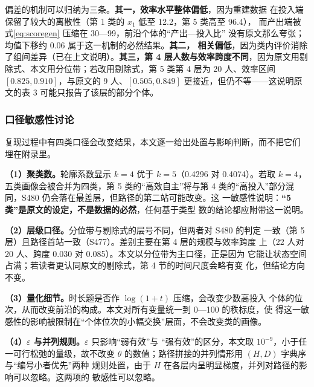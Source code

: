 偏差的机制可以归纳为三条。\textbf{其一，效率水平整体偏低}，因为重建数据
在投入端保留了较大的离散性（第 1 类的 $x_1$ 低至 12.2，第 5 类高至 96.4），
而产出端被式\eqref{eq:scoregen} 压缩在 30—99，前沿个体的“产出—投入比”
没有原文那么夸张；均值下移约 0.06 属于这一机制的必然结果。\textbf{其二，
相关偏低}，因为类内评价消除了组间差异（已在上文说明）。\textbf{其三，第 4
层人数与效率跨度不同}，因为原文用剔除式、本文用分位带；若改用剔除式，第 5
类第 4 层为 20 人、效率区间 $[0.825,0.910]$，与原文的 9 人、$[0.505,
0.849]$ 更接近，但仍不等——这说明原文的表 3 可能只报告了该层的部分个体。

\subsubsection{口径敏感性讨论}
\label{sec:sens}

复现过程中有四类口径会改变结果，本文逐一给出处置与影响判断，而不把它们
埋在附录里。

\textbf{（1）聚类数。}轮廓系数显示 $k=4$ 优于 $k=5$（0.4296 对
0.4074）。若取 $k=4$，五类画像会被合并为四类，第 5 类的“高效自主”将与第
4 类的“高投入”部分混同，S480 仍会落在最差层，但路径的第二站可能改变。这
一敏感性说明：\textbf{“5 类”是原文的设定，不是数据的必然}，任何基于类型
数的结论都应附带这一说明。

\textbf{（2）层级口径。}分位带与剔除式的层号不同，但两者对 S480 的判定
一致（第 5 层）且路径首站一致（S477）。差别主要在第 4 层的规模与效率跨度
上（22 人对 20 人、跨度 0.030 对 0.085）。本文以分位带为主口径，正是因为
它能让状态空间占满；若读者更认同原文的剔除式，第 4 节的时间尺度会略有变
化，但结论方向不变。

\textbf{（3）量化细节。}时长题是否作 $\log(1+t)$ 压缩，会改变少数高投入
个体的位次，从而改变前沿的构成。本文对所有变量统一到 0—100 的秩标度，使
得这一敏感性的影响被限制在“个体位次的小幅交换”层面，不会改变类的画像。

\textbf{（4）$\varepsilon$ 与并列规则。}$\varepsilon$ 只影响“弱有效”与
“强有效”的区分，本文取 $10^{-9}$，小于任一可行松弛的量级，故不改变
$\theta$ 的数值；路径拼接的并列情形用 $(H,D)$ 字典序与“编号小者优先”两种
规则处置，由于 $H$ 在各层内呈明显梯度，并列对路径的影响可以忽略。这两项的
敏感性可以忽略。

